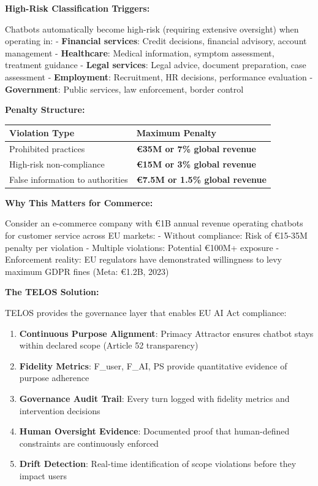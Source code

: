 \textbf{High-Risk Classification Triggers:}

Chatbots automatically become high-risk (requiring extensive oversight)
when operating in: - \textbf{Financial services}: Credit decisions,
financial advisory, account management - \textbf{Healthcare}: Medical
information, symptom assessment, treatment guidance - \textbf{Legal
services}: Legal advice, document preparation, case assessment -
\textbf{Employment}: Recruitment, HR decisions, performance evaluation -
\textbf{Government}: Public services, law enforcement, border control

\textbf{Penalty Structure:}

{\def\LTcaptype{none} %
\begin{longtable}[]{@{}ll@{}}
\toprule\noalign{}
Violation Type & Maximum Penalty \\
\midrule\noalign{}
\endhead
\bottomrule\noalign{}
\endlastfoot
Prohibited practices & \textbf{€35M or 7\% global revenue} \\
High-risk non-compliance & \textbf{€15M or 3\% global revenue} \\
False information to authorities & \textbf{€7.5M or 1.5\% global
revenue} \\
\end{longtable}
}

\textbf{Why This Matters for Commerce:}

Consider an e-commerce company with €1B annual revenue operating
chatbots for customer service across EU markets: - Without compliance:
Risk of €15-35M penalty per violation - Multiple violations: Potential
€100M+ exposure - Enforcement reality: EU regulators have demonstrated
willingness to levy maximum GDPR fines (Meta: €1.2B, 2023)

\textbf{The TELOS Solution:}

TELOS provides the governance layer that enables EU AI Act compliance:

\begin{enumerate}
\def\labelenumi{\arabic{enumi}.}
\tightlist
\item
  \textbf{Continuous Purpose Alignment}: Primacy Attractor ensures
  chatbot stays within declared scope (Article 52 transparency)
\item
  \textbf{Fidelity Metrics}: F\_user, F\_AI, PS provide quantitative
  evidence of purpose adherence
\item
  \textbf{Governance Audit Trail}: Every turn logged with fidelity
  metrics and intervention decisions
\item
  \textbf{Human Oversight Evidence}: Documented proof that human-defined
  constraints are continuously enforced
\item
  \textbf{Drift Detection}: Real-time identification of scope violations
  before they impact users
\end{enumerate}

